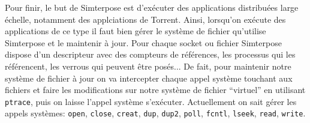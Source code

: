 Pour finir, le but de Simterpose est d'exécuter des applications distribuées large échelle, notamment des applciations de Torrent. Ainsi, lorsqu'on exécute des applications de ce type il faut bien gérer le système de fichier qu'utilise Simterpose et le maintenir à jour. Pour chaque socket ou fichier Simterpose dispose d'un descripteur avec des compteurs de références, les processus qui les référencent, les verrous qui peuvent être posés... De fait, pour maintenir notre système de fichier à jour on va intercepter chaque appel système touchant aux fichiers et faire les modifications sur notre système de fichier ``virtuel'' en utilisant \texttt{ptrace}, puis on laisse l'appel système s'exécuter. Actuellement on sait gérer les appels systèmes: \texttt{open},  \texttt{close}, \texttt{creat}, \texttt{dup}, \texttt{dup2}, \texttt{poll}, \texttt{fcntl}, \texttt{lseek}, \texttt{read}, \texttt{write}.
